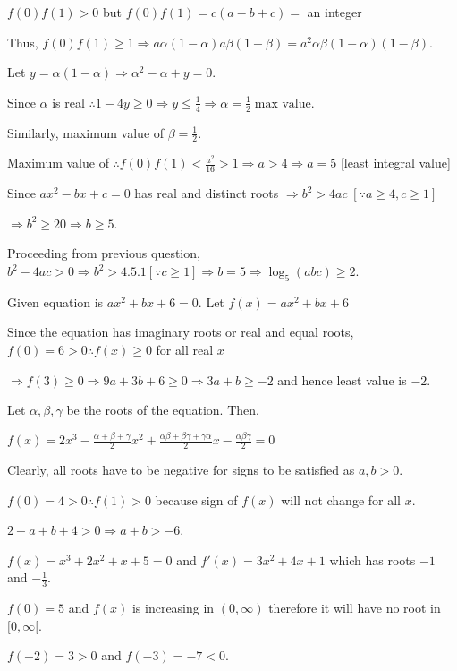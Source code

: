   $f(0)f(1) > 0$ but $f(0)f(1) = c(a - b + c) =$ an integer

  Thus, $f(0)f(1) \ge 1 \Rightarrow a\alpha(1 - \alpha)a\beta(1 - \beta) = a^2\alpha\beta(1 - \alpha)(1 -
  \beta)$.

  Let $y = \alpha(1 - \alpha) \Rightarrow \alpha^2 - \alpha + y = 0$.

  Since $\alpha$ is real $\therefore 1 - 4y \ge 0 \Rightarrow y \le \frac{1}{4} \Rightarrow \alpha =
  \frac{1}{2}\;\text{max value}$.

  Similarly, maximum value of $\beta = \frac{1}{2}$.

  Maximum value of $\therefore f(0)f(1) < \frac{a^2}{16} > 1\Rightarrow a > 4 \Rightarrow a = 5$ [least
    integral value]

  Since $ax^2 - bx + c = 0$ has real and distinct roots $\Rightarrow b^2 > 4ac\;[\because a\geq 4, c\geq 1]$

  $\Rightarrow b^2 \geq 20 \Rightarrow b\geq 5$.
\item Proceeding from previous question, $b^2 - 4ac > 0 \Rightarrow b^2 > 4.5.1 [\because c \ge 1]
  \Rightarrow b = 5\Rightarrow \log_5(abc) \ge 2$.
\item Given equation is $ax^2 + bx + 6 = 0$. Let $f(x) = ax^2 + bx + 6$

  Since the equation has imaginary roots or real and equal roots, $f(0) = 6 > 0\therefore f(x) \ge 0$ for
  all real $x$

  $\Rightarrow f(3) \ge 0 \Rightarrow 9a + 3b + 6 \ge 0\Rightarrow 3a + b \ge -2$ and hence least value is
  $-2$.
\item Let $\alpha, \beta, \gamma$ be the roots of the equation. Then,

  $f(x) = 2x^3 - \frac{\alpha + \beta + \gamma}{2}x^2 + \frac{\alpha\beta + \beta\gamma + \gamma\alpha}{2}x
  -\frac{\alpha\beta\gamma}{2} = 0$

  Clearly, all roots have to be negative for signs to be satisfied as $a, b > 0$.

  $f(0) = 4 > 0 \therefore f(1) > 0$ because sign of $f(x)$ will not change for all $x$.

  $2 + a + b + 4 > 0 \Rightarrow a + b > - 6$.
\item $f(x) = x^3 + 2x^2 + x + 5 = 0$ and $f'(x) = 3x^2 + 4x + 1$ which has roots $-1$ and
  $-\frac{1}{3}$.

  $f(0) = 5$ and $f(x)$ is increasing in $(0, \infty)$ therefore it will have no root in $[0,
  \infty[$.

  $f(-2) = 3 > 0$ and $f(-3) = -7 < 0$.

